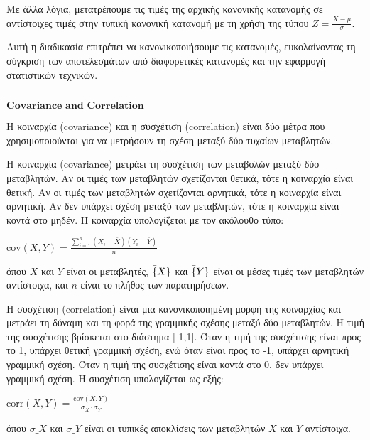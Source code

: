 \documentclass[11pt]{article}
\makeatletter
\newcommand{\boxspacing}{\kern\kvtcb@left@rule\kern\kvtcb@boxsep}
\newcommand{\prompt}[4]{
        {\ttfamily\llap{{\color{#2}[#3]:\hspace{3pt}#4}}\vspace{-\baselineskip}}
    }
\makeatother
\begin{document}
Με άλλα λόγια, μετατρέπουμε τις τιμές της αρχικής κανονικής κατανομής σε
αντίστοιχες τιμές στην τυπική κανονική κατανομή με τη χρήση της τύπου $
Z = \frac{X - \mu}{\sigma} $.

Αυτή η διαδικασία επιτρέπει να κανονικοποιήσουμε τις κατανομές,
ευκολαίνοντας τη σύγκριση των αποτελεσμάτων από διαφορετικές κατανομές
και την εφαρμογή στατιστικών τεχνικών.

    \begin{tcolorbox}[breakable, size=fbox, boxrule=1pt, pad at break*=1mm,colback=cellbackground, colframe=cellborder]
\prompt{In}{incolor}{ }{\boxspacing}
\begin{Verbatim}[commandchars=\\\{\}]

\end{Verbatim}
\end{tcolorbox}

    \(\textbf{Covariance and Correlation}\)

    Η κοιναρχία (covariance) και η συσχέτιση (correlation) είναι δύο μέτρα
που χρησιμοποιούνται για να μετρήσουν τη σχέση μεταξύ δύο τυχαίων
μεταβλητών.

Η κοιναρχία (covariance) μετράει τη συσχέτιση των μεταβολών μεταξύ δύο
μεταβλητών. Αν οι τιμές των μεταβλητών σχετίζονται θετικά, τότε η
κοιναρχία είναι θετική. Αν οι τιμές των μεταβλητών σχετίζονται αρνητικά,
τότε η κοιναρχία είναι αρνητική. Αν δεν υπάρχει σχέση μεταξύ των
μεταβλητών, τότε η κοιναρχία είναι κοντά στο μηδέν. Η κοιναρχία
υπολογίζεται με τον ακόλουθο τύπο:

$ \text{cov}(X,Y) =
\frac{\sum_{i=1}^{n}(X_i - \bar{X})(Y_i - \bar{Y})}{n} $

όπου $ X $ και $ Y $ είναι οι μεταβλητές, $ \bar\{X\} $ και $
\bar\{Y\} $ είναι οι μέσες τιμές των μεταβλητών αντίστοιχα, και $ n $
είναι το πλήθος των παρατηρήσεων.

Η συσχέτιση (correlation) είναι μια κανονικοποιημένη μορφή της
κοιναρχίας και μετράει τη δύναμη και τη φορά της γραμμικής σχέσης μεταξύ
δύο μεταβλητών. Η τιμή της συσχέτισης βρίσκεται στο διάστημα {[}-1,1{]}.
Όταν η τιμή της συσχέτισης είναι προς το 1, υπάρχει θετική γραμμική
σχέση, ενώ όταν είναι προς το -1, υπάρχει αρνητική γραμμική σχέση. Όταν
η τιμή της συσχέτισης είναι κοντά στο 0, δεν υπάρχει γραμμική σχέση. Η
συσχέτιση υπολογίζεται ως εξής:

$ \text{corr}(X,Y) = \frac{\text{cov}(X,Y)}{\sigma_X \cdot \sigma_Y} $

όπου $ \sigma\_X $ και $ \sigma\_Y $ είναι οι τυπικές αποκλίσεις των
μεταβλητών $ X $ και $ Y $ αντίστοιχα.
\end{document}

